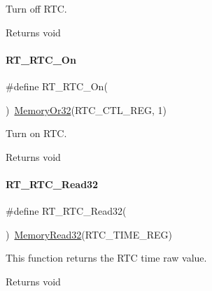 Turn off R\+TC. 

\begin{DoxyReturn}{Returns}
void 
\end{DoxyReturn}
\mbox{\label{a00053_abcec88fd1699e238435a90f1b49f01fc}} 
\paragraph{\texorpdfstring{R\+T\+\_\+\+R\+T\+C\+\_\+\+On}{RT\_RTC\_On}}
{\footnotesize\ttfamily \#define R\+T\+\_\+\+R\+T\+C\+\_\+\+On(\begin{DoxyParamCaption}{ }\end{DoxyParamCaption})~\mbox{\hyperlink{a00020_a9ea92ebccdef6bdaca4d00210cc7266d}{Memory\+Or32}}(R\+T\+C\+\_\+\+C\+T\+L\+\_\+\+R\+EG, 1)}



Turn on R\+TC. 

\begin{DoxyReturn}{Returns}
void 
\end{DoxyReturn}
\mbox{\label{a00053_a61ac395d30cde55137bf04acaec570f0}} 
\paragraph{\texorpdfstring{R\+T\+\_\+\+R\+T\+C\+\_\+\+Read32}{RT\_RTC\_Read32}}
{\footnotesize\ttfamily \#define R\+T\+\_\+\+R\+T\+C\+\_\+\+Read32(\begin{DoxyParamCaption}{ }\end{DoxyParamCaption})~\mbox{\hyperlink{a00020_a706b02571285f92589fbb0b964d7d0bb}{Memory\+Read32}}(R\+T\+C\+\_\+\+T\+I\+M\+E\+\_\+\+R\+EG)}



This function returns the R\+TC time raw value. 

\begin{DoxyReturn}{Returns}
void 
\end{DoxyReturn}
\mbox{\label{a00053_a8929da3f9ad422dd07f18d603c63b7b7}} 
